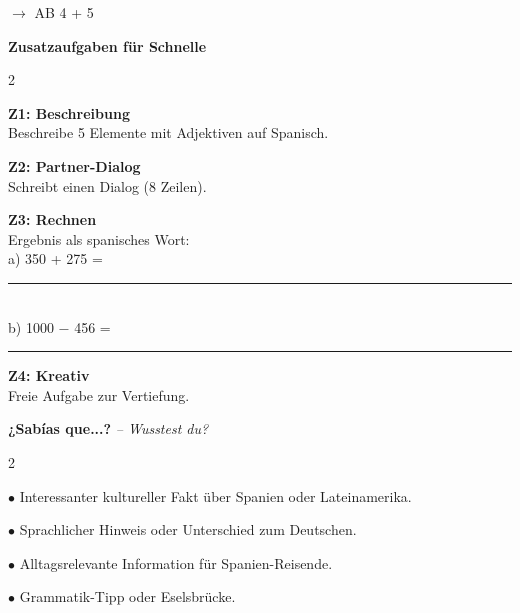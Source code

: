 \documentclass[11pt, a4paper]{article}
\newcommand{\de}[1]{\textit{\textcolor{akzent}{#1}}}
\newcommand{\abmark}[1]{{\footnotesize\textcolor{akzent}{$\rightarrow$ AB #1}}}
\begin{document}
\abmark{4 + 5}

\vspace{8pt}


\begin{zusatzbox}
{\small\textbf{Zusatzaufgaben für Schnelle}}

\vspace{4pt}

\begin{multicols}{2}
\footnotesize

\textbf{Z1: Beschreibung}\\
Beschreibe 5 Elemente mit Adjektiven auf Spanisch.

\vspace{4pt}

\textbf{Z2: Partner-Dialog}\\
Schreibt einen Dialog (8 Zeilen).

\columnbreak

\textbf{Z3: Rechnen}\\
Ergebnis als spanisches Wort:\\
a) 350 + 275 = \rule{2cm}{0.3pt}\\
b) 1000 $-$ 456 = \rule{2cm}{0.3pt}

\vspace{4pt}

\textbf{Z4: Kreativ}\\
Freie Aufgabe zur Vertiefung.

\end{multicols}
\end{zusatzbox}

\vspace{8pt}


\begin{grammatikbox}
\textbf{¿Sabías que...?} \de{-- Wusstest du?}

\vspace{4pt}
\begin{multicols}{2}
\footnotesize

$\bullet$ Interessanter kultureller Fakt über Spanien oder Lateinamerika.

\vspace{3pt}
$\bullet$ Sprachlicher Hinweis oder Unterschied zum Deutschen.

\columnbreak

$\bullet$ Alltagsrelevante Information für Spanien-Reisende.

\vspace{3pt}
$\bullet$ Grammatik-Tipp oder Eselsbrücke.

\end{multicols}
\end{grammatikbox}
\end{document}
